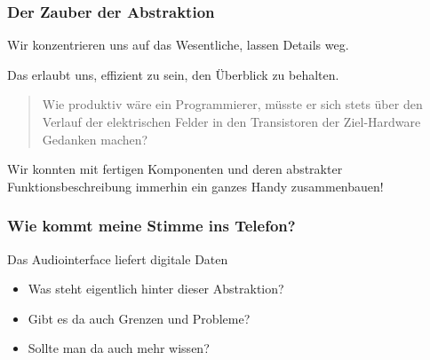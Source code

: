 \begin{frame}
	\frametitle{Der Zauber der Abstraktion}

	Wir konzentrieren uns auf das Wesentliche, lassen Details weg.

	Das erlaubt uns, effizient zu sein, den Überblick zu behalten.
	\bigskip

	\begin{quote}
		Wie produktiv wäre ein Programmierer, müsste er sich stets über den
		Verlauf der elektrischen Felder in den Transistoren der Ziel-Hardware
		Gedanken machen?
	\end{quote}

	\bigskip
	Wir konnten mit fertigen Komponenten und deren abstrakter
	Funktionsbeschreibung immerhin ein ganzes Handy zusammenbauen!

\end{frame}


\begin{frame}
	\frametitle{Wie kommt meine Stimme ins Telefon?}
	\begin{block}{Das Audiointerface liefert digitale Daten}
		\begin{itemize}
			\item Was steht eigentlich hinter dieser Abstraktion?
			\item Gibt es da auch Grenzen und Probleme?
			\item Sollte man da auch mehr wissen?
		\end{itemize}
	\end{block}
\end{frame}

